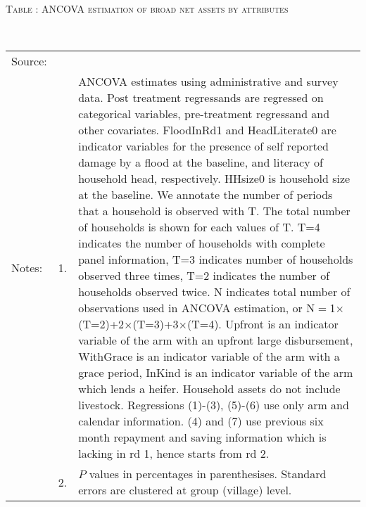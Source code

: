 \hspace{-1cm}\begin{minipage}[t]{14cm}
\hfil\textsc{\normalsize Table \thetable: ANCOVA estimation of broad net assets by attributes\label{tab ANCOVA net assets attributes}}\\
\setlength{\tabcolsep}{1pt}
\setlength{\baselineskip}{8pt}
\renewcommand{\arraystretch}{.55}
\hfil{}\\
\renewcommand{\arraystretch}{.8}
\setlength{\tabcolsep}{1pt}
\begin{tabular}{>{\hfill\scriptsize}p{1cm}<{}>{\hfill\scriptsize}p{.25cm}<{}>{\scriptsize}p{12cm}<{\hfill}}
Source:& \multicolumn{2}{l}{\scriptsize Estimated with GUK administrative and survey data.}\\
Notes: & 1. & ANCOVA estimates using administrative and survey data. Post treatment regressands are regressed on categorical variables, pre-treatment regressand and other covariates. \textsf{FloodInRd1} and \textsf{HeadLiterate0} are indicator variables for the presence of self reported damage by a flood at the baseline, and literacy of household head, respectively. \textsf{HHsize0} is household size at the baseline. We annotate the number of periods that a household is observed with \textsf{T}. The total number of households is shown for each values of \textsf{T}. \textsf{T=4} indicates the number of households with complete panel information, \textsf{T=3} indicates number of households observed three times, \textsf{T=2} indicates the number of households observed twice. \textsf{N} indicates total number of observations used in ANCOVA estimation, or \textsf{N$=$1$\times$(T=2)+2$\times$(T=3)+3$\times$(T=4)}.  \textsf{Upfront} is an indicator variable of the arm with an upfront large disbursement, \textsf{WithGrace} is an indicator variable of the arm with a grace period, \textsf{InKind} is an indicator variable of the arm which lends a heifer. Household assets do not include livestock. Regressions (1)-(3), (5)-(6) use only arm and calendar information. (4) and (7) use previous six month repayment and saving information which is lacking in rd 1, hence starts from rd 2.\\
& 2. & $P$ values in percentages in parenthesises. Standard errors are clustered at group (village) level.
\end{tabular}
\end{minipage}


